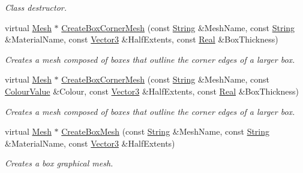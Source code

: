 \begin{DoxyCompactItemize}
\begin{DoxyCompactList}\small\item\em Class destructor. \item\end{DoxyCompactList}\item 
virtual \hyperlink{classMezzanine_1_1Mesh}{Mesh} $\ast$ \hyperlink{classMezzanine_1_1MeshManager_a579c2e8547243b3bea9a748c6bcbf28e}{CreateBoxCornerMesh} (const \hyperlink{namespaceMezzanine_acf9fcc130e6ebf08e3d8491aebcf1c86}{String} \&MeshName, const \hyperlink{namespaceMezzanine_acf9fcc130e6ebf08e3d8491aebcf1c86}{String} \&MaterialName, const \hyperlink{classMezzanine_1_1Vector3}{Vector3} \&HalfExtents, const \hyperlink{namespaceMezzanine_a726731b1a7df72bf3583e4a97282c6f6}{Real} \&BoxThickness)
\begin{DoxyCompactList}\small\item\em Creates a mesh composed of boxes that outline the corner edges of a larger box. \item\end{DoxyCompactList}\item 
virtual \hyperlink{classMezzanine_1_1Mesh}{Mesh} $\ast$ \hyperlink{classMezzanine_1_1MeshManager_abf5e8007a2c37a8d79b72de217a57211}{CreateBoxCornerMesh} (const \hyperlink{namespaceMezzanine_acf9fcc130e6ebf08e3d8491aebcf1c86}{String} \&MeshName, const \hyperlink{classMezzanine_1_1ColourValue}{ColourValue} \&Colour, const \hyperlink{classMezzanine_1_1Vector3}{Vector3} \&HalfExtents, const \hyperlink{namespaceMezzanine_a726731b1a7df72bf3583e4a97282c6f6}{Real} \&BoxThickness)
\begin{DoxyCompactList}\small\item\em Creates a mesh composed of boxes that outline the corner edges of a larger box. \item\end{DoxyCompactList}\item 
virtual \hyperlink{classMezzanine_1_1Mesh}{Mesh} $\ast$ \hyperlink{classMezzanine_1_1MeshManager_a5aa5da93359614b3e3a6b8ee955ff4d4}{CreateBoxMesh} (const \hyperlink{namespaceMezzanine_acf9fcc130e6ebf08e3d8491aebcf1c86}{String} \&MeshName, const \hyperlink{namespaceMezzanine_acf9fcc130e6ebf08e3d8491aebcf1c86}{String} \&MaterialName, const \hyperlink{classMezzanine_1_1Vector3}{Vector3} \&HalfExtents)
\begin{DoxyCompactList}\small\item\em Creates a box graphical mesh. \item\end{DoxyCompactList}\item 

\end{DoxyCompactItemize}
